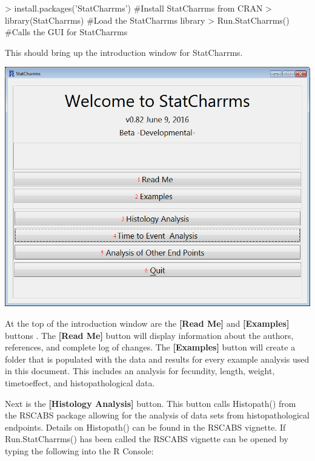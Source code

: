 \documentclass[a4paper]{article}
\begin{document}
\begin{RBox}
> install.packages('StatCharrms')	#Install StatCharrms from CRAN
> library(StatCharrms)		 #Load the StatCharrms library
> Run.StatCharrms()	 	   #Calls the GUI for StatCharrms
\end{RBox}

This should bring up the introduction window for StatCharrms.   



\begin{center}
\hypertarget{fig:IntroWindow}{\includegraphics[width=\textwidth,keepaspectratio]{IntroWindow.png}}
\end{center} 

At the top of the introduction window are the \textbf{[Read Me]} and \textbf{[Examples]} buttons . 
The  \textbf{[Read Me]} button will display information about the authors, references, and complete log of changes.  
The \textbf{[Examples]} button will create a folder that is populated with the data and results for 
every example analysis used in this document. This includes an analysis for fecundity, length, weight,     
time\textendash{}to\textendash{}effect, and histopathological data.    
   
\par 
Next is the \textbf{[Histology Analysis]} button. This button 
calls Histopath() from the RSCABS package allowing for the analysis of data sets from histopathological 
endpoints. Details on Histopath() can be found 
in the RSCABS vignette. If Run.StatCharrms() has been called the RSCABS vignette can be opened by typing the following
into the R Console:
\end{document}
